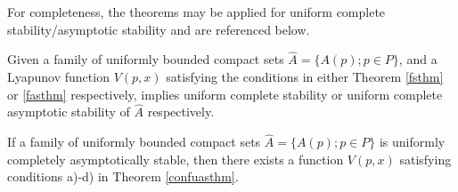 For completeness, the theorems may be applied for uniform complete
stability/asymptotic stability and are referenced below.

\begin{therm}[Sufficiency]
Given a family of uniformly bounded compact sets $\hat{A} = \{A(p);p \in P\}$,
and a Lyapunov function $V(p, x)$ satisfying the conditions in either Theorem
\ref{fsthm} or \ref{fasthm} respectively, implies uniform complete stability or
uniform complete asymptotic stability of $\hat{A}$ respectively.
\end{therm}

\begin{therm}[Converse]
If a family of uniformly bounded compact sets $\hat{A} = \{A(p);p \in P\}$ is
uniformly completely asymptotically stable, then there exists a function
$V(p,x)$ satisfying conditions a)-d) in Theorem \ref{confuasthm}.
\end{therm}

\endinput
